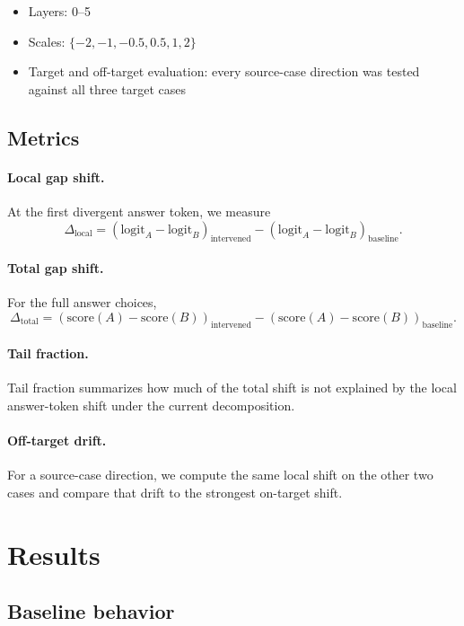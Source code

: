 \documentclass[11pt]{article}
\begin{document}
\begin{itemize}[leftmargin=1.5em]
\item Layers: 0--5
\item Scales: $\{-2,-1,-0.5,0.5,1,2\}$
\item Target and off-target evaluation: every source-case direction was tested
against all three target cases
\end{itemize}

\subsection{Metrics}

\paragraph{Local gap shift.}
At the first divergent answer token, we measure
\[
\Delta_{\mathrm{local}} =
\left(\mathrm{logit}_A - \mathrm{logit}_B\right)_{\mathrm{intervened}} -
\left(\mathrm{logit}_A - \mathrm{logit}_B\right)_{\mathrm{baseline}}.
\]

\paragraph{Total gap shift.}
For the full answer choices,
\[
\Delta_{\mathrm{total}} =
\left(\mathrm{score}(A) - \mathrm{score}(B)\right)_{\mathrm{intervened}} -
\left(\mathrm{score}(A) - \mathrm{score}(B)\right)_{\mathrm{baseline}}.
\]

\paragraph{Tail fraction.}
Tail fraction summarizes how much of the total shift is not explained by the
local answer-token shift under the current decomposition.

\paragraph{Off-target drift.}
For a source-case direction, we compute the same local shift on the other two
cases and compare that drift to the strongest on-target shift.

\section{Results}

\subsection{Baseline behavior}
\end{document}
